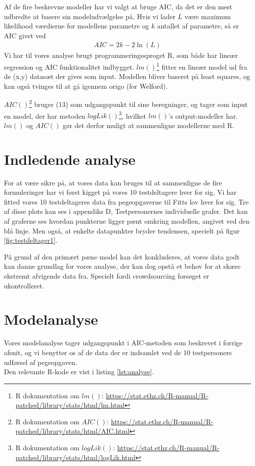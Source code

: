 Af de fire beskrevne modeller har vi valgt at bruge AIC, da det er den mest udbredte at basere sin modeludvælgelse på. Hvis vi lader $L$ være maximum likelihood værdierne for modellens parametre og $k$ antallet af parametre, så er AIC givet ved
\begin{align}
AIC = 2k - 2\ln(L)
\end{align}
Vi har til vores analyse brugt programmeringssproget R, som både har lineær regression og AIC funktionalitet indbygget. $lm()$\footnote{R dokumentation om $lm()$: \url{https://stat.ethz.ch/R-manual/R-patched/library/stats/html/lm.html}} fitter en lineær model ud fra de (x,y) datasæt der gives som input. Modellen bliver baseret på least squares, og kan også tvinges til at gå igennem origo (for Welford).

$AIC()$\footnote{R dokumentation om $AIC()$: \url{https://stat.ethz.ch/R-manual/R-patched/library/stats/html/AIC.html}} bruger (13) som udgangspunkt til sine beregninger, og tager som input en model, der har metoden $logLik()$\footnote{R dokumentation om $logLik()$: \url{https://stat.ethz.ch/R-manual/R-patched/library/stats/html/logLik.html}}, hvilket $lm()$'s output-modeller har. $lm()$ og $AIC()$ gør det derfor muligt at sammenligne modellerne med R.

\section*{Indledende analyse}
For at være sikre på, at vores data kan bruges til at sammenligne de fire formuleringer har vi først kigget på vores 10 testdeltagere hver for sig. Vi har fitted vores 10 testdeltageres data fra pegeopgaverne til Fitts lov hver for sig. Tre af disse plots kan ses i appendiks D, Testpersonernes individuelle grafer.  Det kan af graferne ses hvordan punkterne ligger pænt omkring modellen, angivet ved den blå linje. Men også, at enkelte datapunkter bryder tendensen, specielt på figur \ref{fig:testdeltager1}. 

På grund af den primært pæne model kan det konkluderes, at vores data godt kan danne grundlag for vores analyse, der kan dog opstå et behov for at skære ekstremt afvigende data fra. Specielt fordi crowdsourcing forsøget er ukontrolleret.

\section*{Modelanalyse}
Vores modelanalyse tager udgangspunkt i AIC-metoden som beskrevet i forrige afsnit, og vi benytter os af de data der er indsamlet ved de 10 testpersoners udførsel af pegeopgaven.\\
Den relevante R-kode er vist i listing \ref{lst:analyse}.

